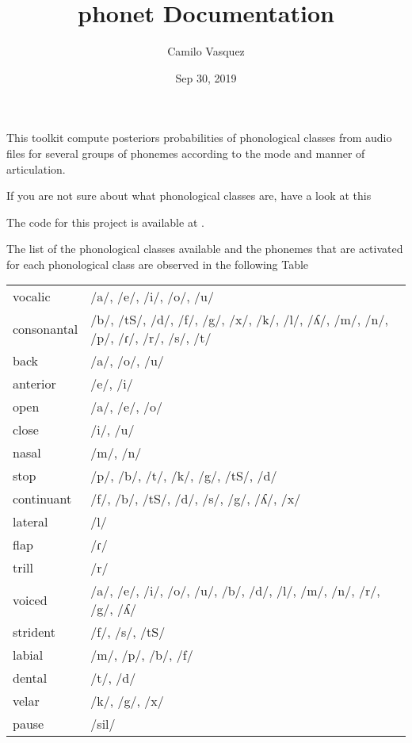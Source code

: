 \documentclass[letterpaper,10pt,english]{sphinxmanual}
\title{phonet Documentation}
\date{Sep 30, 2019}
\author{Camilo Vasquez}
\begin{document}
\maketitle
\sphinxtableofcontents
{}\label{\detokenize{index::doc}}


This toolkit compute posteriors probabilities of phonological classes from audio files for several groups of phonemes according to the mode and manner of articulation.

If you are not sure about what phonological classes are, have a look at this

The code for this project is available at  .

The list of the phonological classes available and the phonemes that are activated for each phonological class are observed in the following Table

\noindent\begin{tabulary}{\linewidth}{|L|L|}
\hline
{}\relax &\relax \\
\hline
vocalic
&
/a/, /e/, /i/, /o/, /u/
\\
\hline
consonantal
&
/b/, /tS/, /d/, /f/, /g/, /x/, /k/, /l/, /ʎ/, /m/, /n/, /p/, /ɾ/, /r/, /s/, /t/
\\
\hline
back
&
/a/, /o/, /u/
\\
\hline
anterior
&
/e/, /i/
\\
\hline
open
&
/a/, /e/, /o/
\\
\hline
close
&
/i/, /u/
\\
\hline
nasal
&
/m/, /n/
\\
\hline
stop
&
/p/, /b/, /t/, /k/, /g/, /tS/, /d/
\\
\hline
continuant
&
/f/, /b/, /tS/, /d/, /s/, /g/, /ʎ/, /x/
\\
\hline
lateral
&
/l/
\\
\hline
flap
&
/ɾ/
\\
\hline
trill
&
/r/
\\
\hline
voiced
&
/a/, /e/, /i/, /o/, /u/, /b/, /d/, /l/, /m/, /n/, /r/, /g/, /ʎ/
\\
\hline
strident
&
/f/, /s/, /tS/
\\
\hline
labial
&
/m/, /p/, /b/, /f/
\\
\hline
dental
&
/t/, /d/
\\
\hline
velar
&
/k/, /g/, /x/
\\
\hline
pause
&
/sil/
\\
\hline\end{tabulary}
\end{document}
